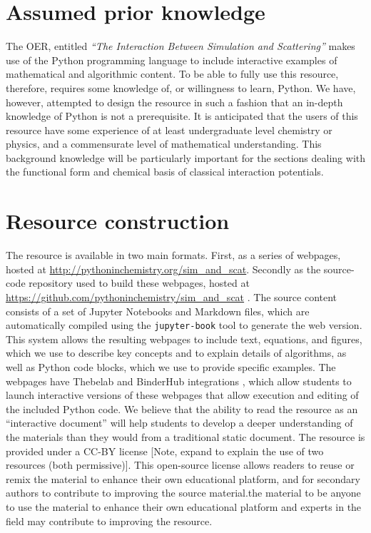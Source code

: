 \documentclass[amsmath,amssymb,twocolumn,superscriptaddress]{revtex4-1}
\begin{document}
\section{Assumed prior knowledge}

The OER, entitled \emph{``The Interaction Between Simulation and Scattering''} makes use of the Python programming language to include interactive examples of mathematical and algorithmic content.
To be able to fully use this resource, therefore, requires some knowledge of, or willingness to learn, Python.
We have, however, attempted to design the resource in such a fashion that an in-depth knowledge of Python is not a prerequisite.
It is anticipated that the users of this resource have some experience of at least undergraduate level chemistry or physics, and a commensurate level of mathematical understanding.
This background knowledge will be particularly important for the sections dealing with the functional form and chemical basis of classical interaction potentials.

\section{Resource construction}

The resource is available in two main formats. First, as a series of webpages, hosted at \url{http://pythoninchemistry.org/sim_and_scat}. 
Secondly as the source-code repository used to build these webpages, hosted at \url{https://github.com/pythoninchemistry/sim_and_scat} \cite{mccluskey_pythoninchemistry/sim_and_scat_2019}. 
The source content consists of a set of Jupyter Notebooks and Markdown files, which are automatically compiled using the \texttt{jupyter-book} tool \cite{lau_jupyter/jupyter-book_2019} to generate the web version.
This system allows the resulting webpages to include text, equations, and figures, which we use to describe key concepts and to explain details of algorithms, as well as Python code blocks, which we use to provide specific examples. The webpages have Thebelab and BinderHub integrations \cite{ragan-kelley_minrk/thebelab_2019, ragan-kelley_jupyterhub/binderhub_2019, jupyter_binder_2018}, which allow students to launch interactive versions of these webpages that allow execution and editing of the included Python code.
We believe that the ability to read the resource as an ``interactive document'' will help students to develop a deeper understanding of the materials than they would from a traditional static document.
The resource is provided under a CC-BY license \cite{noauthor_creative_2019} [Note, expand to explain the use of two resources (both permissive)]. This open-source license allows readers to reuse or remix the material to enhance their own educational platform, and for secondary authors to contribute to improving the source material.the material to be anyone to use the material to enhance their own educational platform and experts in the field may contribute to improving the resource.
\end{document}

